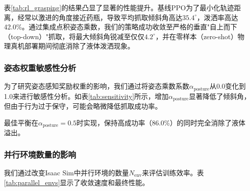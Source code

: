 表\ref{tab:rl_grasping}的结果凸显了显著的性能提升。基线PPO为了最小化轨迹距离，经常以激进的角度接近药瓶，导致平均抓取倾斜角高达$35.4^\circ$，泼洒率高达42.0\%。通过集成点积姿态乘数，我们的策略成功收敛至严格的垂直"自上而下（top-down）"抓取，将最大倾斜角锐减至仅仅$4.2^\circ$，并在零样本（zero-shot）物理真机部署期间彻底消除了液体泼洒现象。

\subsubsection{姿态权重敏感性分析}
\label{subsec:sensitivity_analysis}

为了研究姿态感知奖励权重的影响，我们通过将姿态乘数系数$\alpha_{\text{posture}}$从0.0变化到1.0来进行敏感性分析。如表\ref{tab:sensitivity}所示，增加$\alpha_{\text{posture}}$显著降低了倾斜角，但由于行为过于保守，可能会略微降低抓取成功率。

\begin{table}[!t]
\renewcommand{\arraystretch}{1.3}
\caption{姿态权重$\alpha_{\text{posture}}$的敏感性分析}
\label{tab:sensitivity}
\centering
{}
\end{table}

最佳平衡在$\alpha_{\text{posture}} = 0.5$时实现，保持高成功率（86.0\%）的同时完全消除了液体溢出。

\subsubsection{并行环境数量的影响}
\label{subsec:parallel_envs}

我们通过改变Isaac Sim中并行环境的数量$N_{\text{env}}$来评估训练效率。表\ref{tab:parallel_envs}显示了收敛速度和最终性能。


